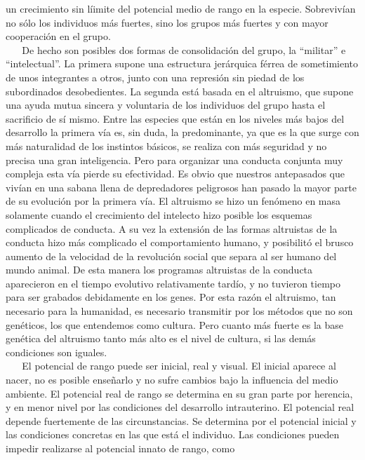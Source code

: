 un crecimiento sin líimite del potencial medio de rango en la especie.
Sobrevivían no sólo los individuos más fuertes, sino los grupos más
fuertes y con mayor cooperación en el grupo.\\
\hspace*{0.333em} ~ ~ De hecho son posibles dos formas de consolidación
del grupo, la ``militar'' e ``intelectual''. La primera supone una
estructura jerárquica férrea de sometimiento de unos integrantes a
otros, junto con una represión sin piedad de los subordinados
desobedientes. La segunda está basada en el altruismo, que supone una
ayuda mutua sincera y voluntaria de los individuos del grupo hasta el
sacrificio de sí mismo. Entre las especies que están en los niveles más
bajos del desarrollo la primera vía es, sin duda, la predominante, ya
que es la que surge con más naturalidad de los instintos básicos, se
realiza con más seguridad y no precisa una gran inteligencia. Pero para
organizar una conducta conjunta muy compleja esta vía pierde su
efectividad. Es obvio que nuestros antepasados que vivían en una sabana
llena de depredadores peligrosos han pasado la mayor parte de su
evolución por la primera vía. El altruismo se hizo un fenómeno en masa
solamente cuando el crecimiento del intelecto hizo posible los esquemas
complicados de conducta. A su vez la extensión de las formas altruistas
de la conducta hizo más complicado el comportamiento humano, y
posibilitó el brusco aumento de la velocidad de la revolución social que
separa al ser humano del mundo animal. De esta manera los programas
altruistas de la conducta aparecieron en el tiempo evolutivo
relativamente tardío, y no tuvieron tiempo para ser grabados debidamente
en los genes. Por esta razón el altruismo, tan necesario para la
humanidad, es necesario transmitir por los métodos que no son genéticos,
los que entendemos como cultura. Pero cuanto más fuerte es la base
genética del altruismo tanto más alto es el nivel de cultura, si las
demás condiciones son iguales.\\
\hspace*{0.333em} ~ ~ El potencial de rango puede ser inicial, real y
visual. El inicial aparece al nacer, no es posible enseñarlo y no sufre
cambios bajo la influencia del medio ambiente. El potencial real de
rango se determina en su gran parte por herencia, y en menor nivel por
las condiciones del desarrollo intrauterino. El potencial real depende
fuertemente de las circunstancias. Se determina por el potencial inicial
y las condiciones concretas en las que está el individuo. Las
condiciones pueden impedir realizarse al potencial innato de rango, como
